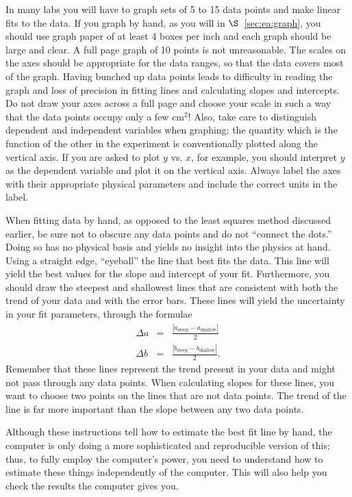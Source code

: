 In many labs you will have to graph sets of 5 to 15 data points 
and make 
linear fits to the data. If you graph by hand, as you will in 
$\S$~\ref{sec:ea:graph}, you should use graph paper of at least 4 boxes per 
inch and each graph should be large and clear. A full
page graph of 10 points is not unreasonable. The scales on the axes should be 
appropriate for the data ranges, so that the data covers most of the graph. 
Having bunched up data points leads to difficulty in reading the graph and 
loss of precision in fitting lines and calculating slopes and intercepts. Do 
not draw your axes across a full page and choose your scale in such a way that 
the data points occupy only a few cm$^2$! Also, take care to distinguish 
dependent and independent variables when graphing; the quantity which is the 
function of the other in the experiment is conventionally plotted along the 
vertical axis. If you are asked to plot $y$ vs. $x$, for example, you should 
interpret $y$ as the dependent variable and plot it on the vertical axis. 
Always label the axes with their appropriate physical parameters and include 
the correct units in the label.

When fitting data by hand, as opposed to the least squares method discussed 
earlier, be sure not to obscure any data points and do not ``connect the 
dots.'' Doing so has no physical basis and yields no insight into the physics 
at hand. Using a straight edge, ``eyeball'' the line that best fits the data.
This line will yield the best values for the slope and intercept of your fit.
Furthermore, you should draw the steepest and shallowest lines that 
are consistent with both the trend of your data and with the error bars. 
These lines will yield the uncertainty in your fit parameters, through the
formulae
\begin{eqnarray*}
\Delta a &=& \frac{|a_{\mbox{steep}}-a_{\mbox{shallow}}|}{2} \\
\Delta b &=& \frac{|b_{\mbox{steep}}-b_{\mbox{shallow}}|}{2}.
\end{eqnarray*}
Remember that these lines represent the trend present in your data and might 
not pass through any data points. When calculating slopes for these lines, you 
want to choose two points on the lines that are not data points. The trend of 
the line is far more important than the slope between any two data points. 

Although these instructions tell how to estimate the best fit line by hand, the
computer is only doing a more sophisticated and reproducible version of this; 
thus, to fully employ the computer's power, you need to understand how to 
estimate these things independently of the computer. This will also help you 
check the results the computer gives you.

